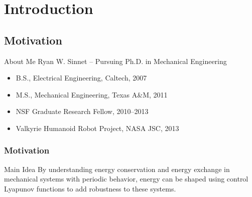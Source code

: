 \section{Introduction}
\showtoc

\subsection{Motivation}

\begin{frame}{About Me}
  Ryan W. Sinnet -- Pursuing Ph.D. in Mechanical Engineering
  \begin{itemize}
    \item B.S., Electrical Engineering, Caltech, 2007
    \item M.S., Mechanical Engineering, Texas A\&M, 2011
    \item NSF Graduate Research Fellow, 2010--2013
    \item Valkyrie Humanoid Robot Project, NASA JSC, 2013
  \end{itemize}
\end{frame}

\begin{frame}
  \frametitle{Motivation}
  \begin{block}{Main Idea}
    By understanding energy conservation and energy exchange in mechanical systems with periodic behavior, energy can be shaped using control Lyapunov functions to add robustness to these systems.
  \end{block}
\end{frame}
